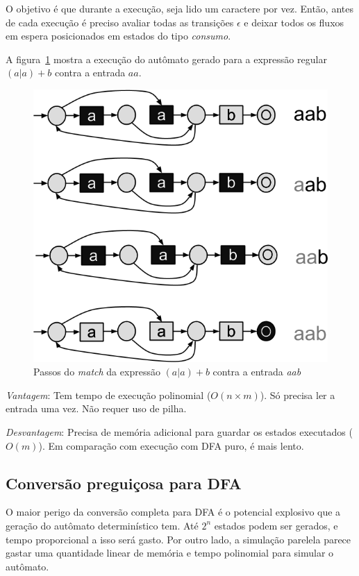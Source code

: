 \documentclass[a4paper,12pt,oneside,onecolumn]{uerj}
\begin{document}
O objetivo é que durante a execução, seja lido um caractere por vez. Então, antes de cada execução é preciso avaliar todas as transições $\epsilon$ e deixar todos os fluxos em espera posicionados em estados do tipo \emph{consumo}.

A figura~\ref{fig:nfa_simultaneo} mostra a execução do autômato gerado para a expressão regular $(a|a)+b$ contra a entrada $aa$.

\begin{figure}[!htbp]
  \centering
  \includegraphics[scale=0.5]{figures/nfa_simultaneo.png}
  \caption{Passos do \emph{match} da expressão $(a|a)+b$ contra a entrada \emph{aab}}
  \label{fig:nfa_simultaneo}
\end{figure}

\emph{Vantagem}: Tem tempo de execução polinomial ($O(n \times m)$). Só precisa ler a entrada uma vez. Não requer uso de pilha.

\emph{Desvantagem}: Precisa de memória adicional para guardar os estados executados ($O(m)$). Em comparação com execução com DFA puro, é mais lento.

\subsection{Conversão preguiçosa para DFA}

O maior perigo da conversão completa para DFA é o potencial explosivo que a geração do autômato determinístico tem. Até $2^n$ estados podem ser gerados, e tempo proporcional a isso será gasto. Por outro lado, a simulação parelela parece gastar uma quantidade linear de memória e tempo polinomial para simular o autômato.
\end{document}
